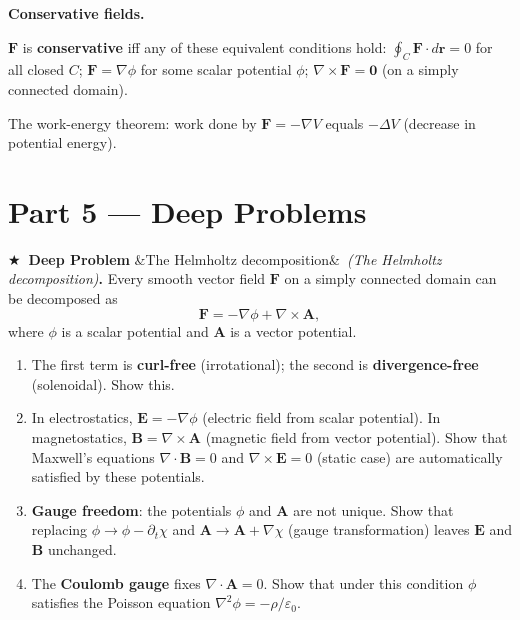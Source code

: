 \documentclass[12pt,a4paper]{article}
\newcounter{problem}
\newcounter{deepproblem}
\newenvironment{deepproblem}[1][]{\refstepcounter{deepproblem}\par\vspace{6pt}\noindent\textbf{\color{NavyBlue}$\bigstar$\ Deep Problem \thedeepproblem}\ifx&#1&\else\ \textit{(#1)}\fi\textbf{.}\enskip}{\par\vspace{4pt}}
\begin{document}
\begin{namebox}
\textbf{Conservative fields.}

$\mathbf{F}$ is \textbf{conservative} iff any of these equivalent conditions hold: $\oint_C\mathbf{F}\cdot d\mathbf{r}=0$ for all closed $C$; $\mathbf{F}=\nabla\phi$ for some scalar potential $\phi$; $\nabla\times\mathbf{F}=\mathbf{0}$ (on a simply connected domain).

The work-energy theorem: work done by $\mathbf{F}=-\nabla V$ equals $-\Delta V$ (decrease in potential energy).
\end{namebox}

\section{Part 5 \texorpdfstring{---}{--} Deep Problems}

\begin{deepproblem}[The Helmholtz decomposition]
Every smooth vector field $\mathbf{F}$ on a simply connected domain can be decomposed as
\[
  \mathbf{F} = -\nabla\phi + \nabla\times\mathbf{A},
\]
where $\phi$ is a scalar potential and $\mathbf{A}$ is a vector potential.
\begin{enumerate}[label=(\alph*)]
  \item The first term is \textbf{curl-free} (irrotational); the second is \textbf{divergence-free} (solenoidal). Show this.
  \item In electrostatics, $\mathbf{E} = -\nabla\phi$ (electric field from scalar potential). In magnetostatics, $\mathbf{B} = \nabla\times\mathbf{A}$ (magnetic field from vector potential). Show that Maxwell's equations $\nabla\cdot\mathbf{B}=0$ and $\nabla\times\mathbf{E}=0$ (static case) are automatically satisfied by these potentials.
  \item \textbf{Gauge freedom}: the potentials $\phi$ and $\mathbf{A}$ are not unique. Show that replacing $\phi\to\phi-\partial_t\chi$ and $\mathbf{A}\to\mathbf{A}+\nabla\chi$ (gauge transformation) leaves $\mathbf{E}$ and $\mathbf{B}$ unchanged.
  \item The \textbf{Coulomb gauge} fixes $\nabla\cdot\mathbf{A}=0$. Show that under this condition $\phi$ satisfies the Poisson equation $\nabla^2\phi = -\rho/\varepsilon_0$.
\end{enumerate}
\end{deepproblem}
\end{document}
